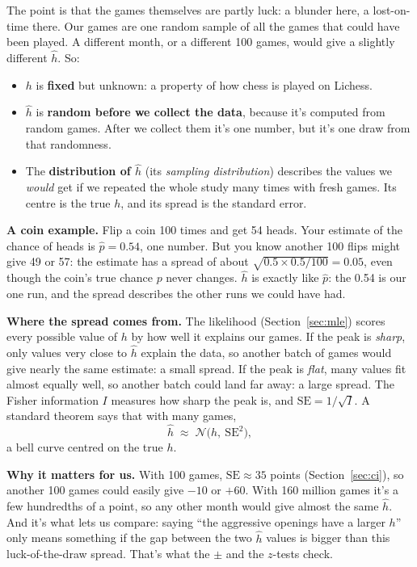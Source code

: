 \documentclass[11pt,a4paper]{article}
\begin{document}
The point is that the games themselves are partly luck: a blunder here, a lost-on-time there.
Our games are one random sample of all the games that could have been played. A different month,
or a different 100 games, would give a slightly different $\hat h$. So:
\begin{itemize}
\item $h$ is \textbf{fixed} but unknown: a property of how chess is played on Lichess.
\item $\hat h$ is \textbf{random before we collect the data}, because it's computed from random
  games. After we collect them it's one number, but it's one draw from that randomness.
\item The \textbf{distribution of $\hat h$} (its \emph{sampling distribution}) describes the
  values we \emph{would} get if we repeated the whole study many times with fresh games. Its
  centre is the true $h$, and its spread is the standard error.
\end{itemize}

\textbf{A coin example.} Flip a coin 100 times and get 54 heads. Your estimate of the chance of
heads is $\hat p = 0.54$, one number. But you know another 100 flips might give 49 or 57: the
estimate has a spread of about $\sqrt{0.5 \times 0.5 / 100} = 0.05$, even though the coin's true
chance $p$ never changes. $\hat h$ is exactly like $\hat p$: the 0.54 is our one run, and the
spread describes the other runs we could have had.

\textbf{Where the spread comes from.} The likelihood (Section~\ref{sec:mle}) scores every possible
value of $h$ by how well it explains our games. If the peak is \emph{sharp}, only values very
close to $\hat h$ explain the data, so another batch of games would give nearly the same
estimate: a small spread. If the peak is \emph{flat}, many values fit almost equally well, so
another batch could land far away: a large spread. The Fisher information $I$ measures how sharp
the peak is, and $\mathrm{SE} = 1/\sqrt{I}$. A standard theorem says that with many games,
\[
\hat h \;\approx\; \mathcal N\big(h,\ \mathrm{SE}^2\big),
\]
a bell curve centred on the true $h$.

\textbf{Why it matters for us.} With 100 games, $\mathrm{SE} \approx 35$ points
(Section~\ref{sec:ci}), so another 100 games could easily give $-10$ or $+60$. With 160 million
games it's a few hundredths of a point, so any other month would give almost the same $\hat h$.
And it's what lets us compare: saying ``the aggressive openings have a larger $h$'' only means
something if the gap between the two $\hat h$ values is bigger than this luck-of-the-draw spread.
That's what the $\pm$ and the $z$-tests check.
\end{document}
